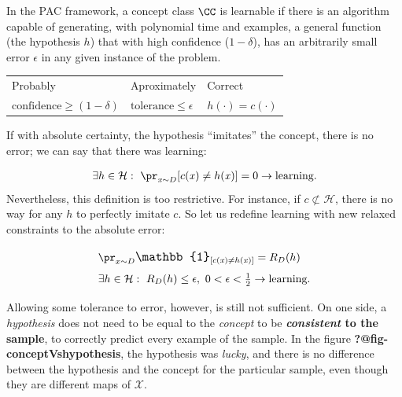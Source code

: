 \documentclass[
  letterpaper,
  12pt,
  british]{tufte-book}
\theoremstyle{plain}
\theoremstyle{definition}
\theoremstyle{plain}
\theoremstyle{remark}
\begin{document}
In the PAC framework, a concept class \(\CC\) is learnable if there is
an algorithm capable of generating, with polynomial time and examples, a
general function (the hypothesis \(h\)) that with high confidence
(\(1-\delta\)), has an arbitrarily small error \(\epsilon\) in any given
instance of the problem.

\begin{longtable}[]{@{}
  >{\centering\arraybackslash}p{}
  >{\centering\arraybackslash}p{}
  >{\centering\arraybackslash}p{}@{}}
\toprule()
\endhead
Probably & Aproximately & Correct \\
\(\scriptstyle \textrm{confidence} \geq(1-\delta)\) &
\({\scriptstyle \textrm{tolerance} \leq\epsilon}\) &
\(\scriptstyle {h(\cdot)=c(\cdot)}\) \\
\bottomrule()
\end{longtable}

If with absolute certainty, the hypothesis ``imitates'' the concept,
there is no error; we can say that there was learning:

\begin{align}
    \exists h \in \mathcal{H}: ~ \pr_{\mathit{x}\sim D}[c(\mathit{x})\neq h(\mathit{x})]=0 \to \text{learning}.
\end{align} Nevertheless, this definition is too restrictive. For
instance, if \(c \not \subset \mathcal{H}\), there is no way for any
\(h\) to perfectly imitate \(c\). So let us redefine learning with new
relaxed constraints to the absolute error:

\begin{align}
    &\pr_{x \sim D}{\Large\mathbb{1}}_{[c(\mathit{x}) \neq h(\mathit{x})]}= R_{D}(h)\\
    &\exists h \in \mathcal{H}:~ R_{D}(h) \leq \epsilon, ~ 0 < \epsilon < \tfrac{1}{2} \to \text{learning}.
\end{align}

Allowing some tolerance to error, however, is still not sufficient. On
one side, a \emph{hypothesis} does not need to be equal to the
\emph{concept} to be \textbf{\emph{consistent} to the sample}, to
correctly predict every example of the sample. In the figure
\textbf{?@fig-conceptVshypothesis}, the hypothesis was \emph{lucky}, and
there is no difference between the hypothesis and the concept for the
particular sample, even though they are different maps of
\(\mathcal{X}\).
\end{document}
